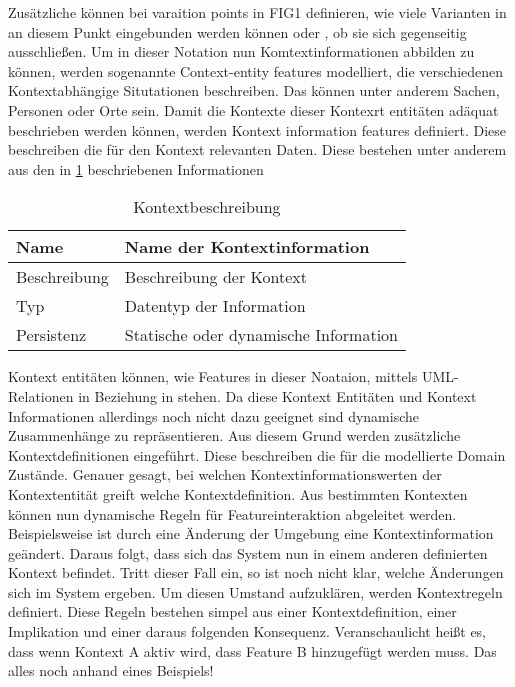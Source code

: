\documentclass{sig-alternate-05-2015}
\begin{document}
Zusätzliche können bei varaition points in FIG1 definieren, wie viele Varianten in an diesem Punkt eingebunden werden können oder , ob sie sich gegenseitig ausschließen. 
Um in dieser Notation nun Komtextinformationen abbilden zu können, werden sogenannte Context-entity features  modelliert, die verschiedenen Kontextabhängige Situtationen beschreiben. 
Das können unter anderem Sachen, Personen oder Orte sein. 
Damit die Kontexte dieser Kontexrt entitäten adäquat beschrieben werden können, werden Kontext information features definiert. 
Diese beschreiben die für den Kontext relevanten Daten. Diese bestehen unter anderem aus den in \ref{tab:context} beschriebenen Informationen

\begin{table}
\label{tab:context}
\centering
\caption{Kontextbeschreibung}
\begin{tabular}{|l|l|}
\hline
Name &	Name der Kontextinformation \\ \hline
Beschreibung	& Beschreibung der Kontext \\ \hline
Typ &	Datentyp der Information \\ \hline
Persistenz &	Statische oder dynamische Information \\ \hline
\end{tabular}
\end{table}



Kontext entitäten können, wie Features in dieser Noataion, mittels UML-Relationen in Beziehung in stehen. 
Da diese Kontext Entitäten und Kontext Informationen allerdings noch nicht dazu geeignet sind dynamische Zusammenhänge zu repräsentieren. 
Aus diesem Grund werden zusätzliche Kontextdefinitionen eingeführt. 
Diese beschreiben die für die modellierte Domain Zustände. Genauer gesagt, bei welchen Kontextinformationswerten der Kontextentität greift welche Kontextdefinition. 
Aus bestimmten Kontexten können nun dynamische Regeln für Featureinteraktion abgeleitet werden. 
Beispielsweise ist durch eine Änderung der Umgebung eine Kontextinformation geändert. 
Daraus folgt, dass sich das System nun in einem anderen definierten Kontext befindet. 
Tritt dieser Fall ein, so ist noch nicht klar, welche Änderungen sich im System ergeben. 
Um diesen Umstand aufzuklären, werden Kontextregeln definiert. 
Diese Regeln bestehen simpel aus einer Kontextdefinition, einer Implikation und einer daraus folgenden Konsequenz. 
Veranschaulicht heißt es, dass wenn Kontext A aktiv wird, dass Feature B hinzugefügt werden muss.
Das alles noch anhand eines Beispiels!
\end{document}
